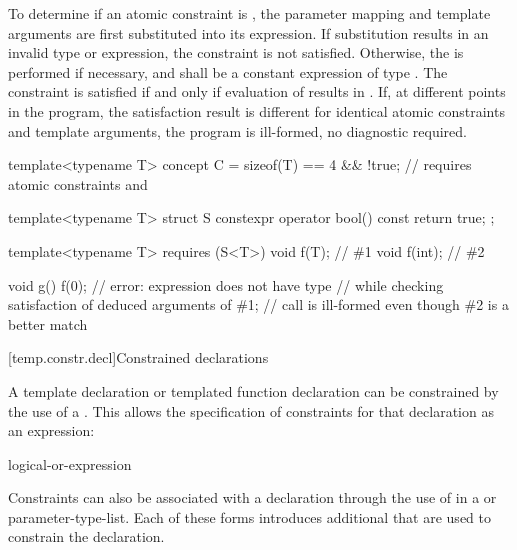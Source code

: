 \pnum
To determine if an atomic constraint is
,
the parameter mapping and template arguments are
first substituted into its expression.
If substitution results in an invalid type or expression,
the constraint is not satisfied.
Otherwise, the 
is performed if necessary,
and  shall be a constant expression of type .
The constraint is satisfied if and only if evaluation of 
results in .
If, at different points in the program, the satisfaction result is different
for identical atomic constraints and template arguments,
the program is ill-formed, no diagnostic required.
\begin{example}
\begin{codeblock}
template<typename T> concept C =
  sizeof(T) == 4 && !true;      // requires atomic constraints  and 

template<typename T> struct S {
  constexpr operator bool() const { return true; }
};

template<typename T> requires (S<T>{})
void f(T);                      // \#1
void f(int);                    // \#2

void g() {
  f(0);                         // error: expression  does not have type 
}                               // while checking satisfaction of deduced arguments of \#1;
                                // call is ill-formed even though \#2 is a better match
\end{codeblock}
\end{example}

[temp.constr.decl]{Constrained declarations}

\pnum
A template declaration
or templated function declaration
can be constrained by the use of a .
This allows the specification of constraints for that declaration as
an expression:
\begin{bnf}
\br
    logical-or-expression
\end{bnf}

\pnum
Constraints can also be associated with a declaration through the use of
in a  or parameter-type-list.
Each of these forms introduces additional 
that are used to constrain the declaration.

